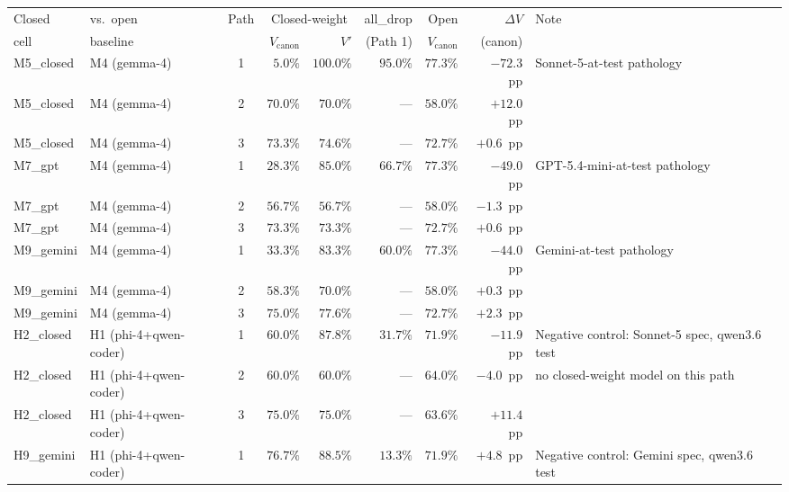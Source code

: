\begin{table}[!htbp]
\begin{tabular*}{\textwidth}{@{\extracolsep{\fill}}llcrrrrrp{3.0cm}@{}}
    \toprule
    Closed & vs.\ open & Path & \multicolumn{2}{c}{Closed-weight} & \multicolumn{1}{c}{all\_drop} & Open & $\Delta V$ & Note \\
    \cmidrule(lr){4-5}
    cell & baseline & & $V_{\text{canon}}$ & $V'$ & (Path 1) & $V_{\text{canon}}$ & (canon) & \\
    \midrule
    M5\_closed & M4 (gemma-4)      & 1 & $\phantom{0}5.0\%$  & $100.0\%$ & $95.0\%$ & $77.3\%$ & $-72.3$~pp & Sonnet-5-at-test pathology \\
    M5\_closed & M4 (gemma-4)      & 2 & $70.0\%$            & $70.0\%$  &    ---   & $58.0\%$ & $+12.0$~pp & \\
    M5\_closed & M4 (gemma-4)      & 3 & $73.3\%$            & $74.6\%$  &    ---   & $72.7\%$ & $+0.6$~pp  & \\
    \midrule
    M7\_gpt    & M4 (gemma-4)      & 1 & $28.3\%$            & $85.0\%$  & $66.7\%$ & $77.3\%$ & $-49.0$~pp & GPT-5.4-mini-at-test pathology \\
    M7\_gpt    & M4 (gemma-4)      & 2 & $56.7\%$            & $56.7\%$  &    ---   & $58.0\%$ & $-1.3$~pp  & \\
    M7\_gpt    & M4 (gemma-4)      & 3 & $73.3\%$            & $73.3\%$  &    ---   & $72.7\%$ & $+0.6$~pp  & \\
    \midrule
    M9\_gemini & M4 (gemma-4)      & 1 & $33.3\%$            & $83.3\%$  & $60.0\%$ & $77.3\%$ & $-44.0$~pp & Gemini-at-test pathology \\
    M9\_gemini & M4 (gemma-4)      & 2 & $58.3\%$            & $70.0\%$  &    ---   & $58.0\%$ & $+0.3$~pp  & \\
    M9\_gemini & M4 (gemma-4)      & 3 & $75.0\%$            & $77.6\%$  &    ---   & $72.7\%$ & $+2.3$~pp  & \\
    \midrule
    H2\_closed & H1 (phi-4+qwen-coder) & 1 & $60.0\%$        & $87.8\%$  & $31.7\%$ & $71.9\%$ & $-11.9$~pp & Negative control: Sonnet-5 spec, qwen3.6 test \\
    H2\_closed & H1 (phi-4+qwen-coder) & 2 & $60.0\%$        & $60.0\%$  &    ---   & $64.0\%$ & $-4.0$~pp  & no closed-weight model on this path \\
    H2\_closed & H1 (phi-4+qwen-coder) & 3 & $75.0\%$        & $75.0\%$  &    ---   & $63.6\%$ & $+11.4$~pp & \\
    \midrule
    H9\_gemini & H1 (phi-4+qwen-coder) & 1 & $76.7\%$        & $88.5\%$  & $13.3\%$ & $71.9\%$ & $+4.8$~pp  & Negative control: Gemini spec, qwen3.6 test \\

\end{tabular*}
\end{table}
